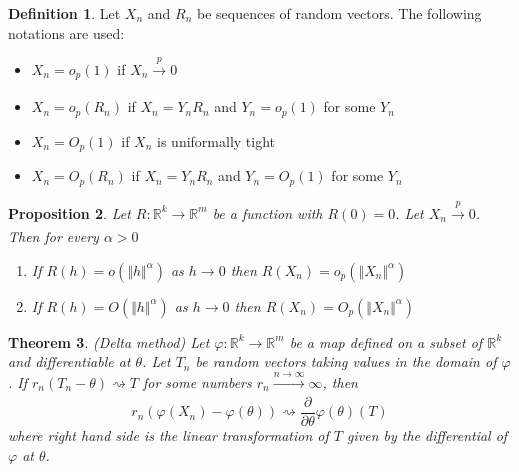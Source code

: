 \documentclass[12pt]{article}
\newtheorem{theorem}{Theorem}[section]
\newtheorem{proposition}[theorem]{Proposition}
\theoremstyle{definition}
\newtheorem{definition}[theorem]{Definition}
\theoremstyle{remark}
\numberwithin{equation}{section}
\newcommand{\RR}{\mathbb{R}}
\begin{document}
\begin{definition}
	Let $X_n$ and $R_n$ be sequences of random vectors. The following notations are used:
	\begin{itemize}
		\item $X_n = o_p(1)$ if $X_n\xrightarrow[]{p}0$
		\item $X_n = o_p(R_n)$ if $X_n = Y_nR_n$ and $Y_n = o_p(1)$ for some $Y_n$
		\item $X_n = O_p(1)$ if $X_n$ is uniformally tight
		\item $X_n = O_p(R_n)$ if $X_n = Y_nR_n$ and $Y_n = O_p(1)$ for some $Y_n$
	\end{itemize}
\end{definition}

\begin{proposition}
Let $R:\RR^k\rightarrow\RR^m$ be a function with $R(0) = 0$. Let $X_n\xrightarrow[]{p} 0$. Then for every $\alpha > 0$
\begin{enumerate}
	\item If $R(h) = o(\Vert h\Vert^\alpha)$ as $h\rightarrow 0$ then $R(X_n) = o_p(\Vert X_n \Vert^\alpha)$
	\item If $R(h) = O(\Vert h\Vert^\alpha)$ as $h\rightarrow 0$ then $R(X_n) = O_p(\Vert X_n \Vert^\alpha)$
\end{enumerate}
\end{proposition}

\begin{theorem}\label{delta_method}\emph{(Delta method)}
	Let $\varphi: \RR^k \rightarrow \RR^m$ be a map defined on a subset of $\RR^k$ and differentiable at $\theta$. Let $T_n$ be random vectors taking values in the domain of $\varphi$. If $r_n(T_n - \theta) \rightsquigarrow T$ for some numbers $r_n \xrightarrow[]{n\rightarrow\infty}\infty$, then \begin{equation*}
	r_n\left(\varphi(X_n) - \varphi(\theta)\right) \rightsquigarrow \frac{\partial}{\partial\theta}\varphi(\theta)(T)
	\end{equation*}
	where right hand side is the linear transformation of $T$ given by the differential of $\varphi$ at $\theta$.
\end{theorem}
\end{document}
